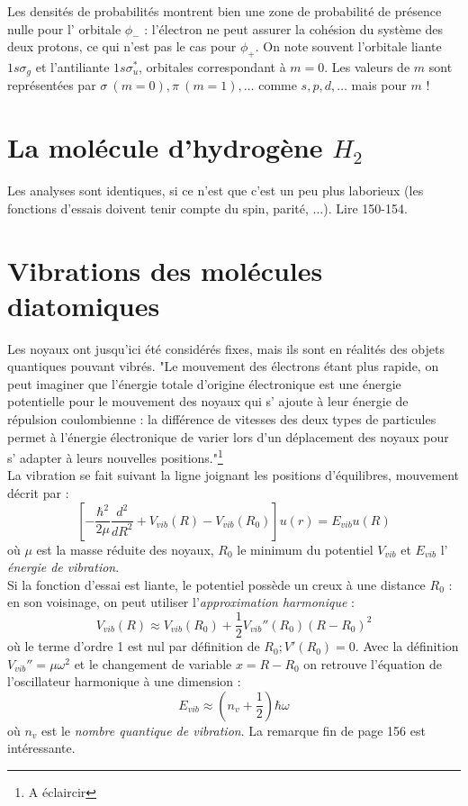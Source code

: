 \documentclass	[11pt, a4paper, openany]{book}
\begin{document}
Les densités de probabilités montrent bien une zone de probabilité de présence nulle pour l'
orbitale $\phi_-$ : l'électron ne peut assurer la cohésion du système des deux protons, ce qui
n'est pas le cas pour $\phi_+$. On note souvent l'orbitale liante $1s\sigma_g$ et l'antiliante
$1s\sigma_u^*$, orbitales correspondant à $m=0$. Les valeurs de $m$ sont représentées par $\sigma\
(m=0), \pi\ (m=1),\dots$ comme $s,p,d,\dots$ mais pour $m$ ! 


\section{La molécule d'hydrogène $H_2$}
Les analyses sont identiques, si ce n'est que c'est un peu plus laborieux (les fonctions d'essais
doivent tenir compte du spin, parité, ...). Lire 150-154.
	
	
\section{Vibrations des molécules diatomiques}
Les noyaux ont jusqu'ici été considérés fixes, mais ils sont en réalités des objets quantiques 
pouvant vibrés. "Le mouvement des électrons étant plus rapide, on peut imaginer que l'énergie 
totale d'origine électronique est une énergie potentielle pour le mouvement des noyaux qui s'
ajoute à leur énergie de répulsion coulombienne : la différence de vitesses des deux types de 
particules permet à l'énergie électronique de varier lors d'un déplacement des noyaux pour s'
adapter à leurs nouvelles positions."\footnote{A éclaircir}\\

La vibration se fait suivant la ligne joignant les positions d'équilibres, mouvement décrit par :
\begin{equation}
\left[-\frac{\hbar^2}{2\mu}\frac{d^2}{dR^2} +V_{vib}(R)-V_{vib}(R_0)\right]u(r) = E_{vib}u(R)
\end{equation}
où $\mu$ est la masse réduite des noyaux, $R_0$ le minimum du potentiel $V_{vib}$ et $E_{vib}$ l'
\textit{énergie de vibration}.\\
Si la fonction d'essai est liante, le potentiel possède un creux à une distance $R_0$ : en son 
voisinage, on peut utiliser l'\textit{approximation harmonique} :
\begin{equation}
V_{vib}(R) \approx V_{vib}(R_0) + \frac{1}{2}V_{vib}''(R_0)(R-R_0)^2
\end{equation}
où le terme d'ordre 1 est nul par définition de $R_0 ; V'(R_0)=0$. Avec la définition $V_{vib}'' 
= \mu\omega^2$ et le changement de variable $x=R-R_0$ on retrouve l'équation de l'oscillateur 
harmonique à une dimension :
\begin{equation}
E_{vib} \approx (n_v+\frac{1}{2})\hbar\omega
\end{equation}
où $n_v$ est le \textit{nombre quantique de vibration}. La remarque fin de page 156 est 
intéressante.
\end{document}
